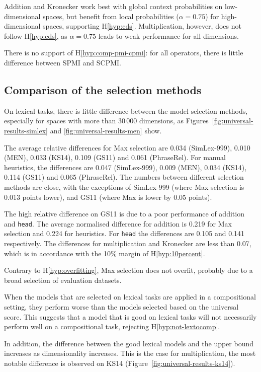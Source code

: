 Addition and Kronecker work best with global context probabilities on low-dimensional spaces, but benefit from local probabilities ($\alpha=0.75$) for high-dimensional spaces, supporting H\ref{hyp:cds}. Multiplication, however, does not follow H\ref{hyp:cds}, as $\alpha=0.75$ leads to weak performance for all dimensions.

There is no support of H\ref{hyp:comp-pmi-cpmi}: for all operators, there is little difference between SPMI and SCPMI.

\subsection{Comparison of the selection methods}
\label{sec:comparison-universal}

On lexical tasks, there is little difference between the model selection methods, especially for spaces with more than 30\,000 dimensions, as Figures~\ref{fig:universal-results-simlex} and \ref{fig:universal-results-men} show.

The average relative differences for Max selection are 0.034 (SimLex-999), 0.010 (MEN), 0.033 (KS14), 0.109 (GS11) and 0.061 (PhraseRel). For manual heuristics, the differences are 0.047 (SimLex-999), 0.009 (MEN), 0.034 (KS14), 0.114 (GS11) and 0.065 (PhraseRel). The numbers between different selection methods are close, with the exceptions of SimLex-999 (where Max selection is 0.013 points lower), and GS11 (where Max is lower by 0.05 points).

The high relative difference on GS11 is due to a poor performance of addition and \texttt{head}. The average normalised difference for addition is 0.219 for Max selection and 0.224 for heuristics. For \texttt{head} the differences are 0.105 and 0.141 respectively. The differences for multiplication and Kronecker are less than 0.07, which is in accordance with the 10\% margin of H\ref{hyp:10percent}.

Contrary to H\ref{hyp:overfitting}, Max selection does not overfit, probably due to a broad selection of evaluation datasets.

When the models that are selected on lexical tasks are applied in a compositional setting, they perform worse than the models selected based on the universal score. This suggests that a model that is good on lexical tasks will not necessarily perform well on a compositional task, rejecting H\ref{hyp:not-lextocomp}.

In addition, the difference between the good lexical models and the upper bound increases as dimensionality increases. This is the case for multiplication, the most notable difference is observed on KS14 (Figure~\ref{fig:universal-results-ks14}).

